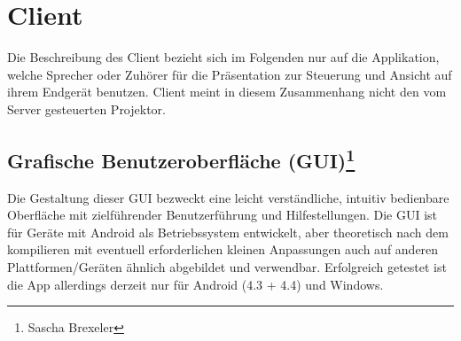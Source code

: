\chapter[Client]{Client}
\thispagestyle{fancy}
\label{client}

Die Beschreibung des Client bezieht sich im Folgenden nur auf die Applikation, welche Sprecher oder Zuhörer für die Präsentation zur Steuerung und Ansicht auf ihrem Endgerät benutzen. Client meint in diesem Zusammenhang nicht den vom Server gesteuerten Projektor.

\section[Grafische Benutzeroberfläche (GUI)]{Grafische Benutzeroberfläche (GUI)\footnote{Sascha Brexeler}}
\label{GUI}
Die Gestaltung dieser GUI bezweckt eine leicht verständliche, intuitiv bedienbare Oberfläche mit zielführender Benutzerführung und Hilfestellungen.
Die GUI ist für Geräte mit Android als Betriebssystem entwickelt, aber theoretisch nach dem kompilieren mit eventuell erforderlichen kleinen Anpassungen auch auf anderen Plattformen/Geräten ähnlich abgebildet und verwendbar. Erfolgreich getestet ist die App allerdings derzeit nur für Android (4.3 + 4.4) und Windows.


